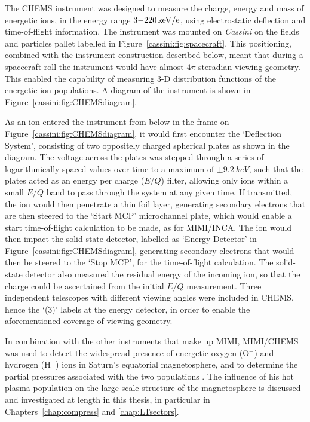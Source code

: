 The CHEMS instrument was designed to measure the charge, energy and mass of energetic ions, in the energy range $3{\--}\SI{220}{keV/e}$, using electrostatic deflection and time-of-flight information. The  instrument was mounted on \textit{Cassini} on the fields and particles pallet labelled in Figure~\ref{cassini:fig:spacecraft}. This positioning, combined  with the instrument construction described below, meant that during a spacecraft roll the instrument would have almost $4\pi$ steradian viewing geometry. This enabled the capability of measuring 3-D distribution functions of the energetic ion populations. A diagram of the instrument is shown in Figure~\ref{cassini:fig:CHEMSdiagram}.

As an ion entered the instrument from below in the frame on Figure~\ref{cassini:fig:CHEMSdiagram}, it would first encounter the `Deflection System', consisting of two oppositely charged spherical plates as shown in the diagram. The voltage across the plates was stepped through a series of logarithmically spaced  values over time to a maximum  of $\pm\SI{9.2}{keV}$, such that the plates acted as an energy per charge ($E/Q$) filter, allowing only ions within a small $E/Q$ band to pass through the system at any given time. If transmitted, the ion would then penetrate a thin foil layer, generating  secondary electrons that are then steered to the `Start MCP' microchannel plate, which would enable a start time-of-flight calculation to be made, as for MIMI/INCA. The ion would then impact the solid-state detector, labelled as `Energy Detector' in Figure~\ref{cassini:fig:CHEMSdiagram}, generating  secondary electrons that would then be steered to the `Stop MCP',  for the time-of-flight calculation. The solid-state detector also measured the residual energy of the incoming ion, so that the charge could be ascertained from the initial $E/Q$ measurement. Three independent telescopes with different viewing angles were included in CHEMS, hence the `(3)' labels at the energy detector, in order to enable the  aforementioned coverage of viewing geometry.

In combination with the other instruments that make up MIMI, MIMI/CHEMS was used to detect the widespread presence of energetic oxygen (O$^+$) and hydrogen (H$^+$) ions in Saturn's equatorial magnetosphere, and  to determine the partial pressures associated with the two populations \citep[e.g.][]{sergis2009}. The influence of his hot plasma population on the large-scale structure of the magnetosphere is discussed and investigated at length in this thesis, in particular in Chapters~\ref{chap:compress} and \ref{chap:LTsectors}.

